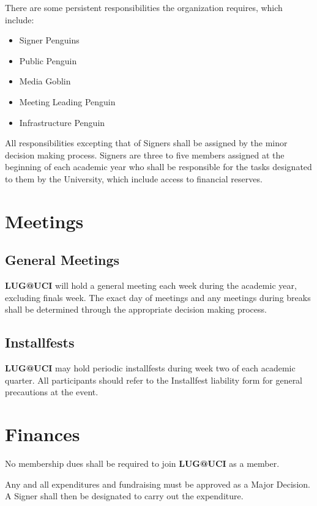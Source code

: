 \documentclass{article}
\begin{document}
There are some persistent responsibilities the organization requires, which 
include:

\begin{itemize}
	
	\item Signer Penguins
	\item Public Penguin
	\item Media Goblin
	\item Meeting Leading Penguin
	\item Infrastructure Penguin
	
\end{itemize}

All responsibilities excepting that of Signers shall be assigned by the minor 
decision making process. Signers are three to five members assigned at the 
beginning of each academic year who shall be responsible for the tasks 
designated to them by the University, which include access to financial 
reserves.

\section{Meetings}

\subsection{General Meetings}

\textbf{LUG@UCI} will hold a general meeting each week during the academic year, 
excluding finals week. The exact day of meetings and any meetings during breaks 
shall be determined through the appropriate decision making process.

\subsection{Installfests}

\textbf{LUG@UCI} may hold periodic installfests during week two of each academic 
quarter. All participants should refer to the Installfest liability form for 
general precautions at the event.

\section{Finances}

No membership dues shall be required to join \textbf{LUG@UCI} as a member.

Any and all expenditures and fundraising must be approved as a Major Decision. A 
Signer shall then be designated to carry out the expenditure.
\end{document}
